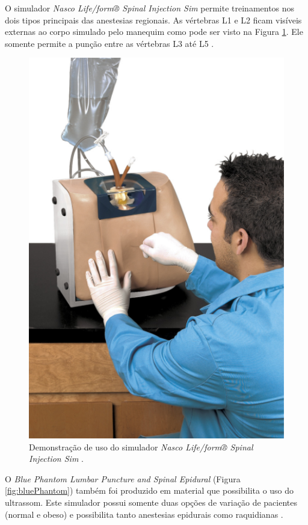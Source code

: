 O simulador \textit{Nasco Life/form® Spinal Injection Sim} permite treinamentos nos dois tipos principais das anestesias regionais. As vértebras L1 e L2 ficam visíveis externas ao corpo simulado pelo manequim como pode ser visto na Figura \ref{fig:nascoSimulator}. Ele somente permite a punção entre as vértebras L3 até L5 \cite{Nasco2008}. 

\begin{figure}[ht!]
    \centering
    \includegraphics[width=0.3\linewidth]{capitulos/figuras/nascoSimulator.png} 
    \caption{Demonstração de uso do simulador \textit{Nasco Life/form® Spinal Injection Sim} \cite{Nasco2008}.}
    \label{fig:nascoSimulator}
\end{figure}

O \textit{Blue Phantom Lumbar Puncture and Spinal Epidural} (Figura \ref{fig:bluePhantom}) também foi produzido em material que possibilita o uso do ultrassom. Este simulador possui somente duas opções de variação de pacientes (normal e obeso) e possibilita tanto anestesias epidurais como raquidianas \cite{BluePhantom2011}. 

